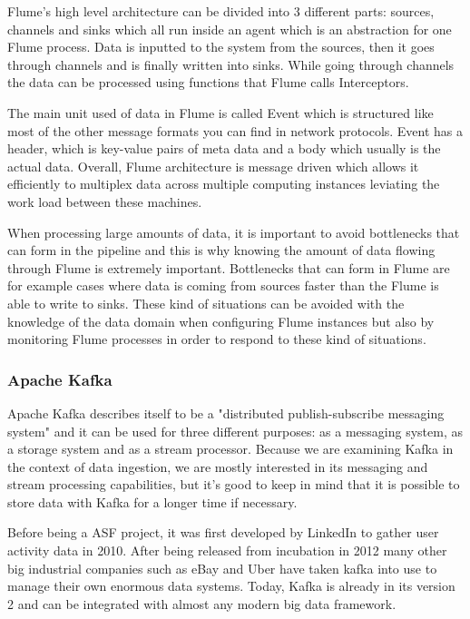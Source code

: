 Flume's high level architecture can be divided into 3 different parts: sources, channels and sinks which all run inside an agent which is an abstraction for one Flume process.
Data is inputted to the system from the sources, then it goes through channels and is finally written into sinks. 
While going through channels the data can be processed using functions that Flume calls Interceptors. \cite{hoffman}

The main unit used of data in Flume is called Event which is structured like most of the other message formats you can find in network protocols.
Event has a header, which is key-value pairs of meta data and a body which usually is the actual data. 
Overall, Flume architecture is message driven which allows it efficiently to multiplex data across multiple computing instances leviating the work load between these machines. \cite{hoffman}

When processing large amounts of data, it is important to avoid bottlenecks that can form in the pipeline and this is why knowing the amount of data flowing through Flume is extremely important.
Bottlenecks that can form in Flume are for example cases where data is coming from sources faster than the Flume is able to write to sinks.
These kind of situations can be avoided with the knowledge of the data domain when configuring Flume instances but also by monitoring Flume processes in order to respond to these kind of situations. \cite{hoffman}

\subsubsection{Apache Kafka}

Apache Kafka describes itself to be a "distributed publish-subscribe messaging system" and it can be used for three different purposes: as a messaging system, as a storage system and as a stream processor. \cite{kafka}
Because we are examining Kafka in the context of data ingestion, we are mostly interested in its messaging and stream processing capabilities, but it's good to keep in mind that it is possible to store data with Kafka for a longer time if necessary.

Before being a ASF project, it was first developed by LinkedIn to gather user activity data in 2010. \cite{ramalingeswara}
After being released from incubation in 2012 many other big industrial companies such as eBay and Uber \cite{yuan} have taken kafka into use to manage their own enormous data systems.
Today, Kafka is already in its version 2 and can be integrated with almost any modern big data framework. \cite{ramalingeswara}


